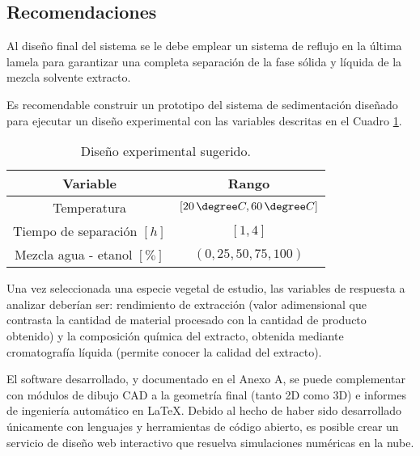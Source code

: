 \begin{center}
	\section{Recomendaciones}
\end{center}

\noindent
\justify

Al dise\~no final del sistema se le debe emplear un sistema de reflujo en la \'ultima lamela para garantizar una completa separaci\'on de la fase s\'olida y l\'iquida de la mezcla solvente extracto.

\noindent
\justify

Es recomendable construir un prototipo del sistema de sedimentaci\'on dise\~nado para ejecutar un dise\~no experimental con las variables descritas en el Cuadro \ref{exps}.

\begin{table}[h!]
	\centering
	\begin{tabular}{|c|c|}
		\hline
		\textbf{Variable} & \textbf{Rango} \\ \hline
		Temperatura & $[20 \, \degree C, 60 \, \degree C]$ \\ \hline
		Tiempo de separaci\'on $[h]$ & $[1, 4]$ \\ \hline
		Mezcla agua - etanol $[\% ]$ & $(0,25,50,75,100)$ \\ \hline
	\end{tabular}
	\caption{Dise\~no experimental sugerido.}
	\label{exps}
\end{table}

\noindent
\justify

Una vez seleccionada una especie vegetal de estudio, las variables de respuesta a analizar deber\'ian ser: rendimiento de extracci\'on (valor adimensional que contrasta la cantidad de material procesado con la cantidad de producto obtenido) y la composici\'on qu\'imica del extracto, obtenida mediante cromatograf\'ia l\'iquida (permite conocer la calidad del extracto).

\noindent
\justify

El software desarrollado, y documentado en el Anexo A, se puede complementar con m\'odulos de dibujo CAD a la geometr\'ia final (tanto 2D como 3D) e informes de ingenier\'ia autom\'atico en \LaTeX. Debido al hecho de haber sido desarrollado \'unicamente con lenguajes y herramientas de c\'odigo abierto, es posible crear un servicio de dise\~no web interactivo que resuelva simulaciones num\'ericas en la nube.